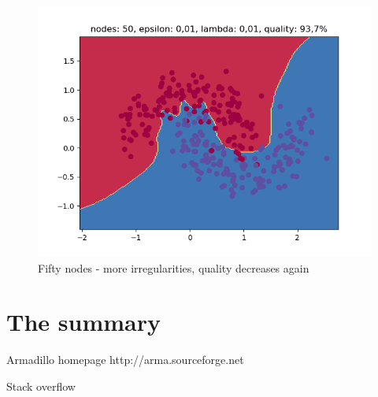 \documentclass[3p,twocolumn]{elsarticle}
\begin{document}
\begin{figure}[h]
\label{fig:fig5}
  \includegraphics[width=\linewidth]{wykresy/21.png}
	\caption{ Fifty nodes - more irregularities, quality decreases again}
	\label{fig5}
\end{figure}

\section{The summary}


%

 \begin{thebibliography}{00}

%

  Armadillo homepage http://arma.sourceforge.net
 
  Stack overflow

 \end{thebibliography}
\end{document}
